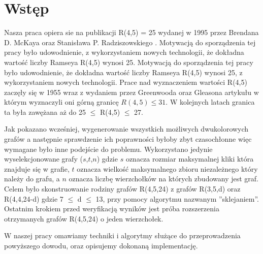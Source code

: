 \chapter{Wstęp}

Nasza praca opiera sie na publikacji R(4,5) = 25 wydanej w 1995 przez Brendana D. McKaya oraz Stanisława P. Radziszowskiego  \cite{mainpaper}. Motywacją do sporządzenia tej pracy było udowodnienie, z wykorzystaniem nowych technologii, że dokładna wartość liczby Ramseya R(4,5) wynosi 25.  Motywacją do sporządzenia tej pracy było udowodnienie, że dokładna wartość liczby Ramseya R(4,5) wynosi 25, z wykorzystaniem nowych technologii. Prace nad wyznaczeniem wartości R(4,5) zaczęły się w 1955 wraz z wydaniem przez Greenwooda oraz Gleasona artykułu w którym wyznaczyli oni górną granicę $R(4,5) \leq 31$. W kolejnych latach granica ta była zawężana aż do 25 $\leq$ R(4,5) $\leq$ 27.\par
Jak pokazano wcześniej, wygenerowanie wszystkich możliwych dwukolorowych grafów a następnie sprawdzenie ich poprawności byłoby zbyt czasochłonne więc wymagane było inne podejście do problemu. Wykorzystano jedynie wyselekcjonowane grafy ($s$,$t$,$n$) gdzie $s$ oznacza rozmiar maksymalnej kliki która znajduje się w grafie, $t$ oznacza wielkość maksymalnego zbioru niezależnego który należy do grafu, a $n$ oznacza liczbę wierzchołków na których zbudowany jest graf. Celem było skonstruowanie rodziny grafów R(4,5,24) z grafów R(3,5,d) oraz R(4,4,24-d) gdzie 7 $\leq$ d $\leq$ 13, przy pomocy algorytmu nazwanym ''sklejaniem''. Ostatnim krokiem przed weryfikacją wyników jest próba rozszerzenia otrzymanych grafów R(4,5,24) o jeden wierzchołek.

W naszej pracy omawiamy techniki i algorytmy służące do przeprowadzenia powyższego dowodu, oraz opisujemy dokonaną implementację.

